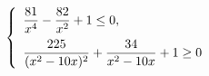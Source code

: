 \begin{ex}[type=ineq_system]
	\begin{condition}
		\( \left\{
		\begin{array}{l}
			\dfrac{81}{x^4}-\dfrac{82}{x^2}+1\le0,\vspace{2mm}\\
			\dfrac{225}{(x^2-10x)^2}+\dfrac{34}{x^2-10x}+1\ge0
		\end{array}
		\right. \)
	\end{condition}
\end{ex}